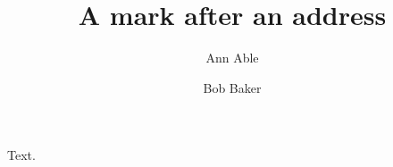 \documentclass{article}
\begin{document}
\title{A mark after an address}
\author[1]{Ann Able}
\author[2]{Bob Baker}
\date{}
\maketitle
Text.
\end{document}
